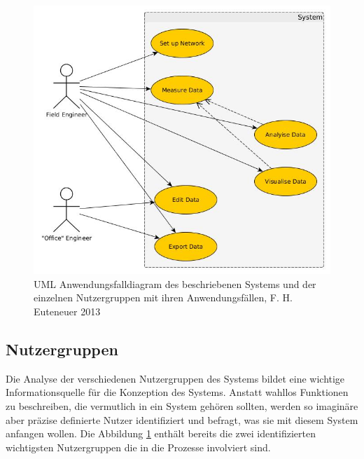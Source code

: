 \begin{figure}[H]
	\centering
 	 \includegraphics[scale=0.6]{graphics/uml_functionalities.jpg} 
	\caption{UML Anwendungsfalldiagram des beschriebenen Systems und der einzelnen Nutzergruppen mit ihren Anwendungsfällen, F. H. Euteneuer 2013}
	 \label{fig:model_functionalities}
\end{figure}

\subsection{Nutzergruppen}
Die Analyse der verschiedenen Nutzergruppen des Systems bildet eine wichtige Informationsquelle für die Konzeption des Systems. Anstatt wahllos Funktionen zu beschreiben, die vermutlich in ein System gehören sollten, werden so imaginäre aber präzise definierte Nutzer identifiziert und befragt, was sie mit diesem System anfangen wollen. Die Abbildung \ref{fig:model_functionalities} enthält bereits die zwei identifizierten wichtigsten Nutzergruppen die in die Prozesse involviert sind.

